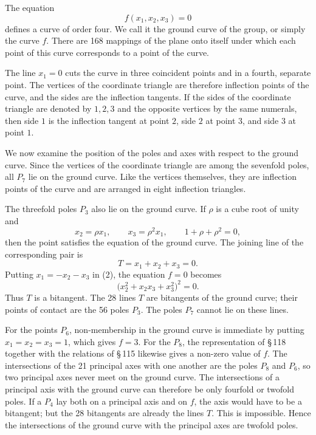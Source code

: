\documentclass[11pt]{article}
\begin{document}
The equation
\begin{equation}
f(x_1,x_2,x_3)=0
\tag{5}
\end{equation}
defines a curve of order four. We call it the ground curve of the group, or simply the curve \(f\). There are 168 mappings of the plane onto itself under which each point of this curve corresponds to a point of the curve.

The line \(x_1=0\) cuts the curve in three coincident points and in a fourth, separate point. The vertices of the coordinate triangle are therefore inflection points of the curve, and the sides are the inflection tangents. If the sides of the coordinate triangle are denoted by \(1,2,3\) and the opposite vertices by the same numerals, then side \(1\) is the inflection tangent at point \(2\), side \(2\) at point \(3\), and side \(3\) at point \(1\).

We now examine the position of the poles and axes with respect to the ground curve. Since the vertices of the coordinate triangle are among the sevenfold poles, all \(P_7\) lie on the ground curve. Like the vertices themselves, they are inflection points of the curve and are arranged in eight inflection triangles.

The threefold poles \(P_3\) also lie on the ground curve. If \(\rho\) is a cube root of unity and
\begin{equation}
x_2=\rho x_1,
\qquad
x_3=\rho^2x_1,
\qquad
1+\rho+\rho^2=0,
\end{equation}
then the point satisfies the equation of the ground curve. The joining line of the corresponding pair is
\begin{equation}
T=x_1+x_2+x_3=0.
\end{equation}
Putting \(x_1=-x_2-x_3\) in (2), the equation \(f=0\) becomes
\begin{equation}
\bigl(x_2^2+x_2x_3+x_3^2\bigr)^2=0.
\end{equation}
Thus \(T\) is a bitangent. The 28 lines \(T\) are bitangents of the ground curve; their points of contact are the 56 poles \(P_3\). The poles \(P_7\) cannot lie on these lines.

For the points \(P_6\), non-membership in the ground curve is immediate by putting \(x_1=x_2=x_3=1\), which gives \(f=3\). For the \(P_8\), the representation of \S\,118 together with the relations of \S\,115 likewise gives a non-zero value of \(f\). The intersections of the 21 principal axes with one another are the poles \(P_8\) and \(P_6\), so two principal axes never meet on the ground curve. The intersections of a principal axis with the ground curve can therefore be only fourfold or twofold poles. If a \(P_4\) lay both on a principal axis and on \(f\), the axis would have to be a bitangent; but the 28 bitangents are already the lines \(T\). This is impossible. Hence the intersections of the ground curve with the principal axes are twofold poles.
\end{document}

